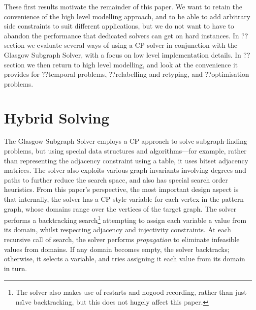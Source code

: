 \documentclass[runningheads]{llncs}
\begin{document}
These first results motivate the remainder of this paper. We want to retain the convenience of the
high level modelling approach, and to be able to add arbitrary side constraints to suit different
applications, but we do not want to have to abandon the performance that dedicated solvers can get
on hard instances. In ??section we evaluate several ways of using a CP solver in
conjunction with the Glasgow Subgraph Solver, with a focus on low level implementation details. In
??section we then return to high level modelling, and look at the convenience it provides for
??temporal problems, ??relabelling and retyping, and ??optimisation problems.

\section{Hybrid Solving}

The Glasgow Subgraph Solver employs a CP approach to solve subgraph-finding problems, but using
special data structures and algorithms---for example, rather than representing the adjacency
constraint using a table, it uses bitset adjacency matrices. The solver also exploits various graph
invariants involving degrees and paths to further reduce the search space, and also has special
search order heuristics. From this paper's perspective, the most important design aspect is that
internally, the solver has a CP style variable for each vertex in the pattern graph, whose domains
range over the vertices of the target graph. The solver performs a backtracking search\footnote{The
solver also makes use of restarts and nogood recording, rather than just na\"\i{}ve backtracking,
but this does not hugely affect this paper.}
attempting to assign each variable a value from its domain, whilst respecting adjacency and
injectivity constraints. At each recursive call of search, the solver performs \emph{propagation} to
eliminate infeasible values from domains. If any domain becomes empty, the solver backtracks;
otherwise, it selects a variable, and tries assigning it each value from its domain in turn.
\end{document}

